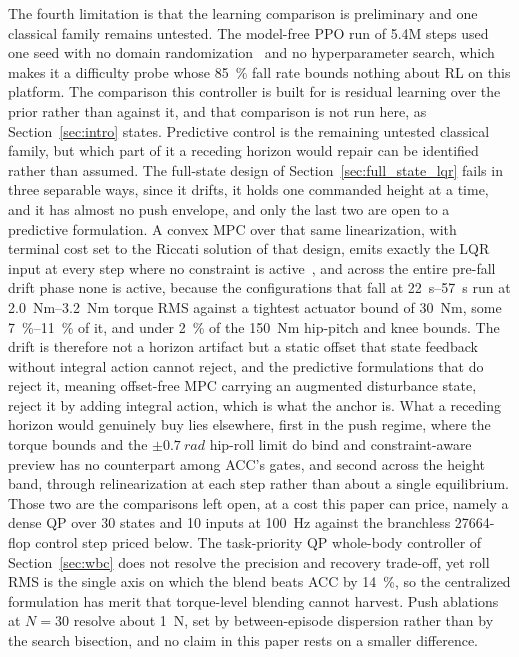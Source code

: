 \documentclass[a4paper,fleqn]{cas-dc}
\begin{document}
The fourth limitation is that the learning comparison is preliminary and one
classical family remains untested. The model-free PPO run of 5.4M steps used one
seed with no domain randomization~\cite{tobin2017domainrand,peng2018dynrand} and
no hyperparameter search, which makes it a difficulty probe whose
\SI{85}{\percent} fall rate bounds nothing about RL on this platform. The
comparison this controller is built for is residual learning over the prior
rather than against it, and that comparison is not run here, as
Section~\ref{sec:intro} states. Predictive control is the remaining untested
classical family, but which part of it a receding horizon would repair can be
identified rather than assumed. The full-state design of
Section~\ref{sec:full_state_lqr} fails in three separable ways, since it drifts,
it holds one commanded height at a time, and it has almost no push envelope, and
only the last two are open to a predictive formulation. A convex MPC over that
same linearization, with terminal cost set to the Riccati solution of that
design, emits exactly the LQR input at every step where no constraint is
active~\cite{rawlings2017mpc}, and across the entire pre-fall drift phase none
is active, because the configurations that fall at \SIrange{22}{57}{s} run at
\SIrange{2.0}{3.2}{Nm} torque RMS against a tightest actuator bound of
\SI{30}{Nm}, some \SIrange{7}{11}{\percent} of it, and under \SI{2}{\percent} of
the \SI{150}{Nm} hip-pitch and knee bounds. The drift is therefore not a horizon
artifact but a static offset that state feedback without integral action cannot
reject, and the predictive formulations that do reject it, meaning offset-free
MPC carrying an augmented disturbance state, reject it by adding integral
action, which is what the anchor is. What a receding horizon would genuinely buy
lies elsewhere, first in the push regime, where the torque bounds and the
$\pm\SI{0.7}{rad}$ hip-roll limit do bind and constraint-aware preview has no
counterpart among ACC's gates, and second across the height band, through
relinearization at each step rather than about a single equilibrium. Those two
are the comparisons left open, at a cost this paper can price, namely a dense QP
over \num{30} states and \num{10} inputs at \SI{100}{Hz} against the branchless
\num{27664}-flop control step priced below. The task-priority QP whole-body
controller of Section~\ref{sec:wbc} does not resolve the precision and recovery
trade-off, yet roll RMS is the single axis on which the blend beats ACC by
\SI{14}{\percent}, so the centralized formulation has merit that torque-level
blending cannot harvest. Push ablations at $N{=}30$ resolve about \SI{1}{N}, set
by between-episode dispersion rather than by the search bisection, and no claim
in this paper rests on a smaller difference.
\end{document}
